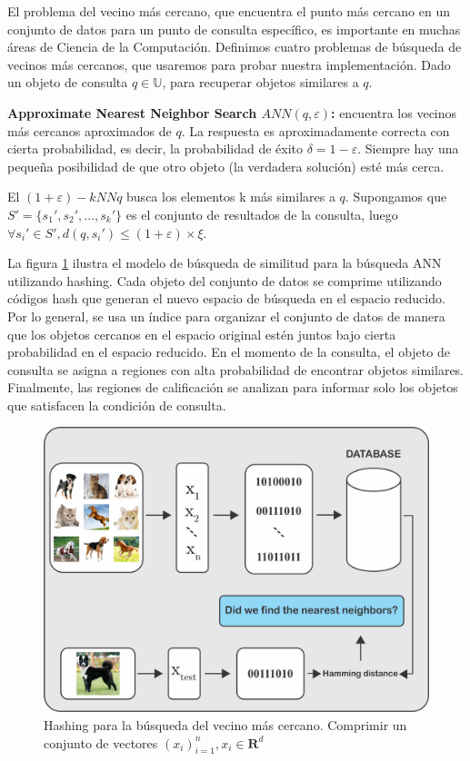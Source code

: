 El problema del vecino más cercano, que encuentra el punto más cercano en un conjunto de datos para un punto de consulta específico, es importante en muchas áreas de Ciencia de la Computación. Definimos cuatro problemas de búsqueda de vecinos más cercanos, que usaremos para probar nuestra implementación. Dado un objeto de consulta $ q \in \mathbb{U} $, para recuperar objetos similares a $ q $.

\textbf{Approximate Nearest Neighbor Search $ ANN (q, \varepsilon) $:} encuentra los vecinos más cercanos aproximados de $ q $. La respuesta es aproximadamente correcta con cierta probabilidad, es decir, la probabilidad de éxito $ \delta = 1 - \varepsilon $. Siempre hay una pequeña posibilidad de que otro objeto (la verdadera solución) esté más cerca.

El $ (1+ \varepsilon) -kNNq $ busca los elementos k más similares a $ q $. Supongamos que $ S'= \{s_1', s_2', ..., s_k' \} $ es el conjunto de resultados de la consulta, luego $ \forall s_i'\in S', d (q, s_i') \leq ( 1 + \varepsilon) \times \xi $.

La figura \ref{searchmodelcap5} ilustra el modelo de búsqueda de similitud para la búsqueda ANN utilizando hashing. Cada objeto del conjunto de datos se comprime utilizando códigos hash que generan el nuevo espacio de búsqueda en el espacio reducido. Por lo general, se usa un índice para organizar el conjunto de datos de manera que los objetos cercanos en el espacio original estén juntos bajo cierta probabilidad en el espacio reducido. En el momento de la consulta, el objeto de consulta se asigna a regiones con alta probabilidad de encontrar objetos similares. Finalmente, las regiones de calificación se analizan para informar solo los objetos que satisfacen la condición de consulta.

\begin{figure}[htp]
\label{searchmodelcap5}
\includegraphics[width=0.7\columnwidth]{chapter5/ima1.png}
\centering
\caption{ Hashing para la búsqueda del vecino más cercano. Comprimir un conjunto de vectores  $(x_i)^{n}_{i=1}, x_i \in \mathbf{R}^d $ }
\end{figure}

